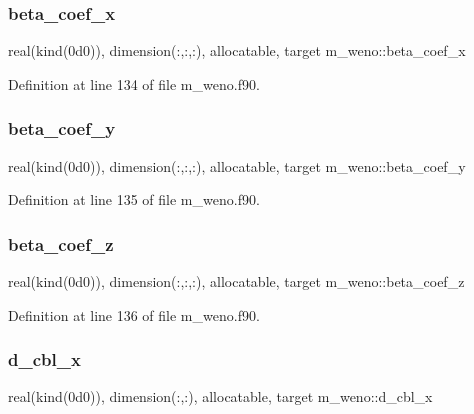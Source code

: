 \subsubsection{\texorpdfstring{beta\+\_\+coef\+\_\+x}{beta\_coef\_x}}
{\footnotesize\ttfamily real(kind(0d0)), dimension(\+:,\+:,\+:), allocatable, target m\+\_\+weno\+::beta\+\_\+coef\+\_\+x}



Definition at line 134 of file m\+\_\+weno.\+f90.

\mbox{\label{namespacem__weno_aa1574c8b4d69b5e40fa2ec0c86816136}} 
\subsubsection{\texorpdfstring{beta\+\_\+coef\+\_\+y}{beta\_coef\_y}}
{\footnotesize\ttfamily real(kind(0d0)), dimension(\+:,\+:,\+:), allocatable, target m\+\_\+weno\+::beta\+\_\+coef\+\_\+y}



Definition at line 135 of file m\+\_\+weno.\+f90.

\mbox{\label{namespacem__weno_aea41f263d17898f7dbe955a7ff6edff7}} 
\subsubsection{\texorpdfstring{beta\+\_\+coef\+\_\+z}{beta\_coef\_z}}
{\footnotesize\ttfamily real(kind(0d0)), dimension(\+:,\+:,\+:), allocatable, target m\+\_\+weno\+::beta\+\_\+coef\+\_\+z}



Definition at line 136 of file m\+\_\+weno.\+f90.

\mbox{\label{namespacem__weno_a64f585ebbc4e1bdaa629668e6dcc1c93}} 
\subsubsection{\texorpdfstring{d\+\_\+cbl\+\_\+x}{d\_cbl\_x}}
{\footnotesize\ttfamily real(kind(0d0)), dimension(\+:,\+:), allocatable, target m\+\_\+weno\+::d\+\_\+cbl\+\_\+x}



